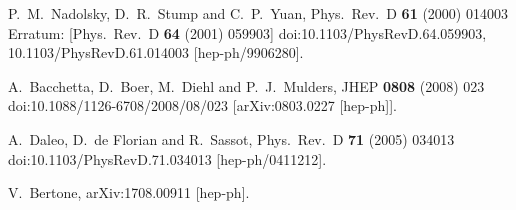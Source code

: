 \documentclass[10pt,a4paper]{article}
\begin{document}
\begin{thebibliography}{alp}
  P.~M.~Nadolsky, D.~R.~Stump and C.~P.~Yuan,
  Phys.\ Rev.\ D {\bf 61} (2000) 014003
   Erratum: [Phys.\ Rev.\ D {\bf 64} (2001) 059903]
  doi:10.1103/PhysRevD.64.059903, 10.1103/PhysRevD.61.014003
  [hep-ph/9906280].

  A.~Bacchetta, D.~Boer, M.~Diehl and P.~J.~Mulders,
  JHEP {\bf 0808} (2008) 023
  doi:10.1088/1126-6708/2008/08/023
  [arXiv:0803.0227 [hep-ph]].

  A.~Daleo, D.~de Florian and R.~Sassot,
  Phys.\ Rev.\ D {\bf 71} (2005) 034013
  doi:10.1103/PhysRevD.71.034013
  [hep-ph/0411212].

  V.~Bertone,
  arXiv:1708.00911 [hep-ph].

\end{thebibliography}
\end{document}
